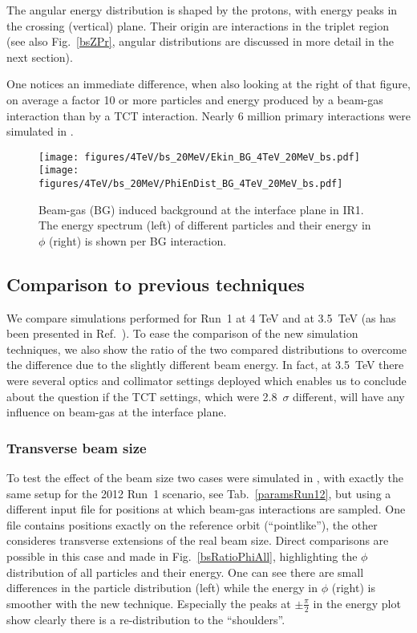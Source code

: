 The angular energy distribution is shaped by the protons, with energy peaks in the crossing (vertical) plane. Their origin are interactions in the triplet region (see also Fig.~\ref{bsZPr}, angular distributions are discussed in more detail in the next section).

One notices an immediate difference, when also looking at the right of that figure, on average a factor 10 or more particles and energy produced by a beam-gas interaction than by a TCT interaction. Nearly 6 million primary interactions were simulated in \fluka.%


\begin{figure}%
\centering
\texttt{[image: figures/4TeV/bs\_20MeV/Ekin\_BG\_4TeV\_20MeV\_bs.pdf]}
\texttt{[image: figures/4TeV/bs\_20MeV/PhiEnDist\_BG\_4TeV\_20MeV\_bs.pdf]}
 \caption{Beam-gas (BG) induced background at the interface plane in IR1. The energy spectrum (left) of different particles and their energy in $\phi$ (right) is shown per BG interaction.
  \label{dist4TeVBGbs}}
\end{figure}
\subsection{Comparison to previous techniques}

We compare simulations performed for Run~1 at 4 TeV and at 3.5~TeV (as has been presented in Ref.~\cite{nimPaperRod}). To ease the comparison of the new simulation techniques, we also show the ratio of the two compared distributions to overcome the difference due to the slightly different beam energy. In fact, at 3.5~TeV there were several optics and collimator settings deployed which enables us to conclude about the question if the TCT settings, which were 2.8~$\sigma$ different, will have any influence on beam-gas at the interface plane. 


\subsubsection{Transverse beam size}
To test the effect of the beam size two cases were simulated in \fluka, with exactly the same setup for the 2012 Run~1 scenario, see Tab.~\ref{paramsRun12}, but using a different input file for positions at which beam-gas interactions are sampled. One file contains positions exactly on the reference orbit (``pointlike''), the other consideres transverse extensions of the real beam size. Direct comparisons are possible in this case and made in Fig.~\ref{bsRatioPhiAll}, highlighting the $\phi$ distribution of all particles and their energy. One can see there are small differences in the particle distribution (left) while the energy in $\phi$ (right) is smoother with the new technique. Especially the peaks at $\pm \frac{\pi}{2}$ in the energy plot show clearly there is a re-distribution to the ``shoulders''.

